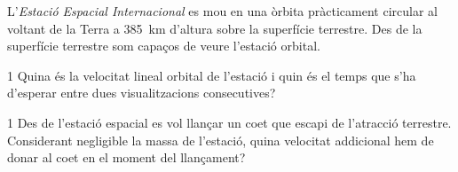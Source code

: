 L'\textit{Estació Espacial Internacional} es mou en una òrbita pràcticament circular al voltant de la Terra a 385~km d'altura sobre la superfície terrestre. Des de la superfície terrestre som capaços de veure l'estació orbital.


\begin{apartat}{1}
Quina és la velocitat lineal orbital de l'estació i quin és el temps que s'ha d'esperar entre dues visualitzacions consecutives?
\end{apartat}

\begin{apartat}{1}
Des de l'estació espacial es vol llançar un coet que escapi de l'atracció terrestre. Considerant negligible la massa de l'estació, quina velocitat addicional hem de donar al coet en el moment del llançament?
\end{apartat}

